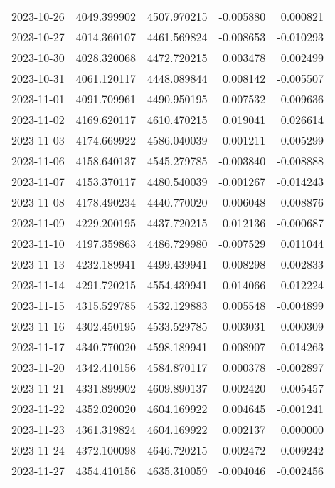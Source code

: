 \begin{tabular}{lrrrr}
2023-10-26 & 4049.399902 & 4507.970215 &       -0.005880 &     0.000821 \\
2023-10-27 & 4014.360107 & 4461.569824 &       -0.008653 &    -0.010293 \\
2023-10-30 & 4028.320068 & 4472.720215 &        0.003478 &     0.002499 \\
2023-10-31 & 4061.120117 & 4448.089844 &        0.008142 &    -0.005507 \\
2023-11-01 & 4091.709961 & 4490.950195 &        0.007532 &     0.009636 \\
2023-11-02 & 4169.620117 & 4610.470215 &        0.019041 &     0.026614 \\
2023-11-03 & 4174.669922 & 4586.040039 &        0.001211 &    -0.005299 \\
2023-11-06 & 4158.640137 & 4545.279785 &       -0.003840 &    -0.008888 \\
2023-11-07 & 4153.370117 & 4480.540039 &       -0.001267 &    -0.014243 \\
2023-11-08 & 4178.490234 & 4440.770020 &        0.006048 &    -0.008876 \\
2023-11-09 & 4229.200195 & 4437.720215 &        0.012136 &    -0.000687 \\
2023-11-10 & 4197.359863 & 4486.729980 &       -0.007529 &     0.011044 \\
2023-11-13 & 4232.189941 & 4499.439941 &        0.008298 &     0.002833 \\
2023-11-14 & 4291.720215 & 4554.439941 &        0.014066 &     0.012224 \\
2023-11-15 & 4315.529785 & 4532.129883 &        0.005548 &    -0.004899 \\
2023-11-16 & 4302.450195 & 4533.529785 &       -0.003031 &     0.000309 \\
2023-11-17 & 4340.770020 & 4598.189941 &        0.008907 &     0.014263 \\
2023-11-20 & 4342.410156 & 4584.870117 &        0.000378 &    -0.002897 \\
2023-11-21 & 4331.899902 & 4609.890137 &       -0.002420 &     0.005457 \\
2023-11-22 & 4352.020020 & 4604.169922 &        0.004645 &    -0.001241 \\
2023-11-23 & 4361.319824 & 4604.169922 &        0.002137 &     0.000000 \\
2023-11-24 & 4372.100098 & 4646.720215 &        0.002472 &     0.009242 \\
2023-11-27 & 4354.410156 & 4635.310059 &       -0.004046 &    -0.002456 \\

\end{tabular}
